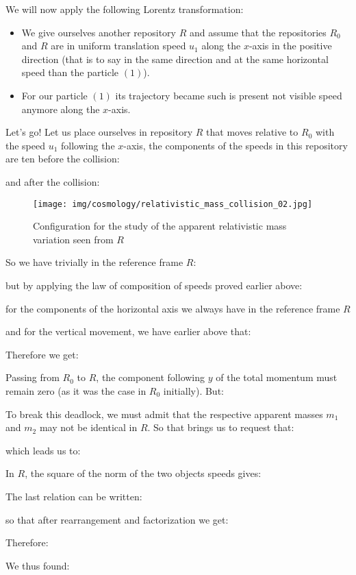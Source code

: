 	We will now apply the following Lorentz transformation:
	\begin{itemize}
		\item We give ourselves another repository $R$ and assume that the repositories $R_0$ and $R$ are in uniform translation speed $u_1$ along the $x$-axis in the positive direction (that is to say in the same direction and at the same horizontal speed than the particle $(1)$).
		
		\item For our particle $(1)$ its trajectory became such is present not visible speed anymore along the $x$-axis.
	\end{itemize}
	Let's go! Let us place ourselves in repository $R$ that moves relative to $R_0$ with the speed $u_1$ following the $x$-axis, the components of the speeds in this repository are ten before the collision:
	
	and after the collision:
	
	\begin{figure}[H]
		\centering
		\texttt{[image: img/cosmology/relativistic\_mass\_collision\_02.jpg]}
		\caption{Configuration for the study of the apparent relativistic mass variation seen from $R$}
	\end{figure}
	So we have trivially in the reference frame $R$:
	
	but by applying the law of composition of speeds proved earlier above:
	
	for the components of the horizontal axis we always have in the reference frame $R$
	
	and for the vertical movement, we have earlier above that:
	
	Therefore we get:
	
	Passing from $R_0$ to $R$, the component following $y$ of the total momentum must remain zero (as it was the case in $R_0$ initially). But:
	
	To break this deadlock, we must admit that the respective apparent masses $m_1$ and $m_2$ may not be identical in $R$. So that brings us to request that:
	
	which leads us to:
	
	In $R$, the square of the norm of the two objects speeds gives:
	
	The last relation can be written:
	
	so that after rearrangement and factorization we get:
	
	Therefore:
	
	We thus found:
	
